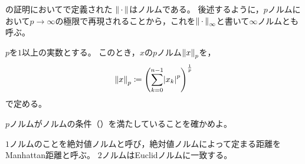 \documentclass[b5paper,draft,oneside,openany]{ltjsbook} %
\begin{document}
\begin{eg}[一様ノルム]
    の証明においてで定義された
    $\norm{\dummy}$はノルムである。
    後述するように，$p$ノルムにおいて$p\to\infty$の極限で再現されることから，これを$\norm{\dummy}_\infty$と書いて$\infty$ノルムとも呼ぶ。
\end{eg}

\begin{defi}[$p$ノルム]
    $p$を$1$以上の実数とする。
    このとき，$x$の$p$ノルム$\norm{x}_p$を，
    \begin{equation}
        \norm{x}_p \coloneqq \pare{\sum_{k=0}^{n-1} \abs{x_k}^p}^{\frac{1}{p}}
    \end{equation}
    で定める。
\end{defi}

\begin{prob}
    $p$ノルムがノルムの条件（）を満たしていることを確かめよ。
\end{prob}

$1$ノルムのことを絶対値ノルムと呼び，絶対値ノルムによって定まる距離をManhattan距離と呼ぶ。
$2$ノルムはEuclidノルムに一致する。
\end{document}
